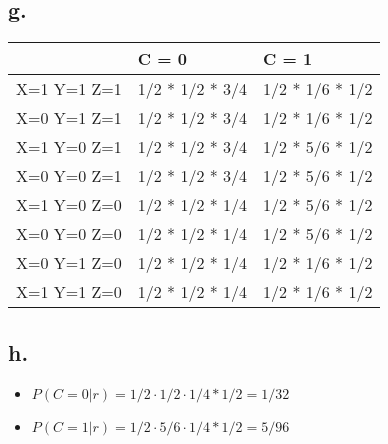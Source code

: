 \documentclass[11pt]{article}
\begin{document}
\subsection*{g.}
\label{sec:orga63ad21}
\begin{center}
\begin{tabular}{l|ll}
 & C = 0 & C = 1\\
\hline
X=1 Y=1 Z=1 & 1/2 * 1/2 * 3/4 & 1/2 * 1/6 * 1/2\\
X=0 Y=1 Z=1 & 1/2 * 1/2 * 3/4 & 1/2 * 1/6 * 1/2\\
X=1 Y=0 Z=1 & 1/2 * 1/2 * 3/4 & 1/2 * 5/6 * 1/2\\
X=0 Y=0 Z=1 & 1/2 * 1/2 * 3/4 & 1/2 * 5/6 * 1/2\\
X=1 Y=0 Z=0 & 1/2 * 1/2 * 1/4 & 1/2 * 5/6 * 1/2\\
X=0 Y=0 Z=0 & 1/2 * 1/2 * 1/4 & 1/2 * 5/6 * 1/2\\
X=0 Y=1 Z=0 & 1/2 * 1/2 * 1/4 & 1/2 * 1/6 * 1/2\\
X=1 Y=1 Z=0 & 1/2 * 1/2 * 1/4 & 1/2 * 1/6 * 1/2\\
\end{tabular}
\end{center}
\subsection*{h.}
\label{sec:org9189aba}
\begin{itemize}
\item \(P(C = 0|r) = 1/2 \cdot 1/2 \cdot 1/4 * 1/2 = 1/32\)
\item \(P(C = 1|r) = 1/2 \cdot 5/6 \cdot 1/4 * 1/2 = 5/96\)
\end{itemize}
\end{document}
